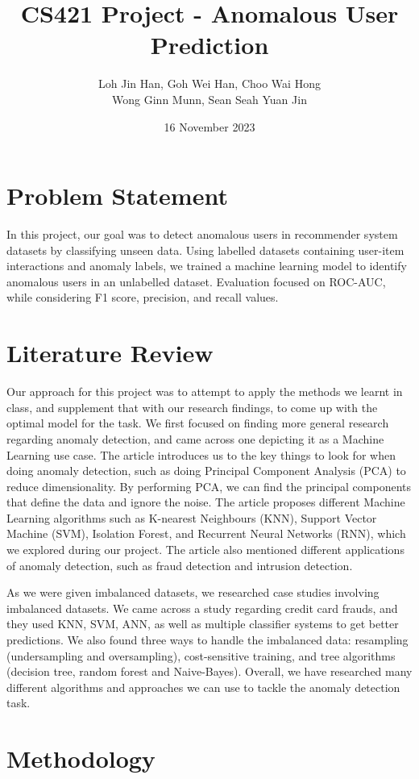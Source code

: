 \documentclass[12pt]{article}
\title{CS421 Project - Anomalous User Prediction}
\author{Loh Jin Han, Goh Wei Han, Choo Wai Hong\\Wong Ginn Munn, Sean Seah Yuan Jin}
\date{16 November 2023}
\begin{document}
\maketitle
\tableofcontents
\pagebreak
\section{Problem Statement}
In this project, our goal was to detect anomalous users in recommender system datasets by classifying unseen data. Using labelled datasets containing user-item interactions and anomaly labels, we trained a machine learning model to identify anomalous users in an unlabelled dataset. Evaluation focused on ROC-AUC, while considering F1 score, precision, and recall values.

\section{Literature Review}
Our approach for this project was to attempt to apply the methods we learnt in class, and supplement that with our research findings, to come up with the optimal model for the task. We first focused on finding more general research regarding anomaly detection, and came across one depicting it as a Machine Learning use case. \cite{kuangHaoAnomalyDetection} The article introduces us to the key things to look for when doing anomaly detection, such as doing Principal Component Analysis (PCA) to reduce dimensionality. By performing PCA, we can find the principal components that define the data and ignore the noise. The article proposes different Machine Learning algorithms such as K-nearest Neighbours (KNN), Support Vector Machine (SVM), Isolation Forest, and Recurrent Neural Networks (RNN), which we explored during our project. The article also mentioned different applications of anomaly detection, such as fraud detection and intrusion detection.

As we were given imbalanced datasets, we researched case studies involving imbalanced datasets. We came across a study regarding credit card frauds, and they used KNN, SVM, ANN, as well as multiple classifier systems to get better predictions. \cite{8985298} We also found three ways to handle the imbalanced data: resampling (undersampling and oversampling), cost-sensitive training, and tree algorithms (decision tree, random forest and Naive-Bayes). \cite{Mînăstireanu_Meşniţă_2020} Overall, we have researched many different algorithms and approaches we can use to tackle the anomaly detection task.
\section{Methodology}
\end{document}
